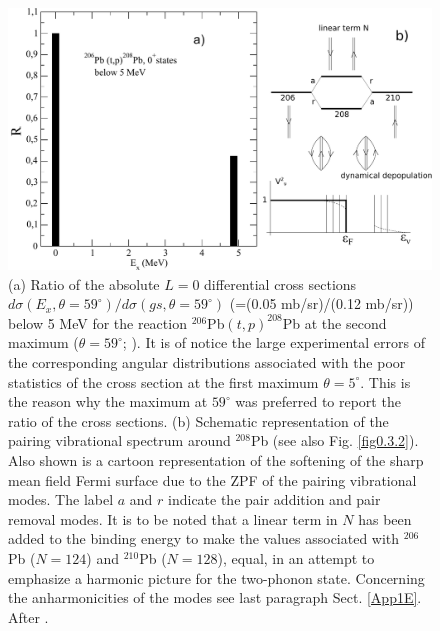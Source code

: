 \begin{figure}
\centerline{\includegraphics*[width=\textwidth,angle=0]{nutshell/figs/Excited0Pb206tp.pdf}}
\caption[$^{206}$Pb$(t,p)^{208}$Pb.]{(a) Ratio of the absolute $L=0$ differential cross sections $d\sigma(E_x,\theta=59^{\circ})/d\sigma(gs,\theta=59^{\circ})$ (=(0.05 mb/sr)/(0.12 mb/sr)) below 5 MeV  for the reaction $^{206}$Pb$(t,p)^{208}$Pb at the second maximum ($\theta=59^{\circ}$; \cite{Bjerregaard:66b}). It is of notice the large experimental errors of the corresponding angular distributions associated with the poor statistics of the cross section at the first maximum $\theta=5^{\circ}$. This is the reason why the maximum at $59^\circ$ was preferred to report the ratio of the cross sections. (b) Schematic representation of the pairing vibrational spectrum around $^{208}$Pb (see also Fig. \ref{fig0.3.2}). Also shown is a cartoon representation of the softening of the sharp mean field Fermi surface due to the ZPF of the pairing vibrational modes. The label $a$ and $r$ indicate the pair addition and pair removal modes. It is to be noted that a linear term in $N$ has been added to the binding energy to make the  values associated with $^{206}$Pb ($N=124$) and $^{210}$Pb ($N=128$), equal, in an attempt to emphasize a harmonic picture for the two-phonon state. Concerning the anharmonicities of the modes see last paragraph Sect. \ref{App1E}. After \cite{Potel:13}.}\label{fig1.1}
\end{figure}



